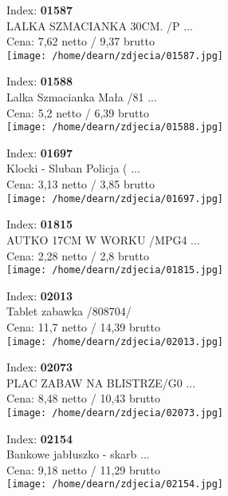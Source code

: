 {Index: \textbf{01587}\\
LALKA SZMACIANKA 30CM. /P ...\\
Cena: 7,62 netto / 9,37 brutto\\
  \texttt{[image: /home/dearn/zdjecia/01587.jpg]}}\newline\newline

{Index: \textbf{01588}\\
Lalka Szmacianka Mała /81 ...\\
Cena: 5,2 netto / 6,39 brutto\\
  \texttt{[image: /home/dearn/zdjecia/01588.jpg]}}\newline\newline

{Index: \textbf{01697}\\
Klocki - Sluban Policja ( ...\\
Cena: 3,13 netto / 3,85 brutto\\
  \texttt{[image: /home/dearn/zdjecia/01697.jpg]}}\newline\newline

{Index: \textbf{01815}\\
AUTKO 17CM W WORKU  /MPG4 ...\\
Cena: 2,28 netto / 2,8 brutto\\
  \texttt{[image: /home/dearn/zdjecia/01815.jpg]}}\newline\newline

{Index: \textbf{02013}\\
Tablet zabawka /808704/\\
Cena: 11,7 netto / 14,39 brutto\\
  \texttt{[image: /home/dearn/zdjecia/02013.jpg]}}\newline\newline

{Index: \textbf{02073}\\
PLAC ZABAW NA BLISTRZE/G0 ...\\
Cena: 8,48 netto / 10,43 brutto\\
  \texttt{[image: /home/dearn/zdjecia/02073.jpg]}}\newline\newline

{Index: \textbf{02154}\\
Bankowe jabłuszko - skarb ...\\
Cena: 9,18 netto / 11,29 brutto\\
  \texttt{[image: /home/dearn/zdjecia/02154.jpg]}}\newline\newline

